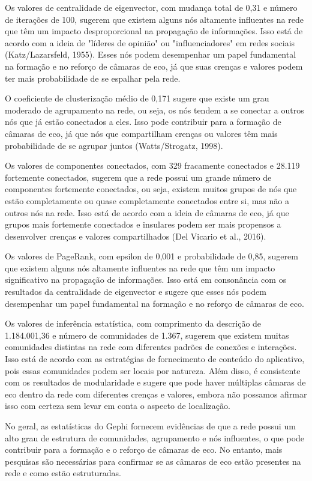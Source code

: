 Os valores de centralidade de eigenvector, com mudança total de 0,31 e número de iterações de 100, sugerem que existem alguns nós altamente influentes na rede que têm um impacto desproporcional na propagação de informações. Isso está de acordo com a ideia de "líderes de opinião" ou "influenciadores" em redes sociais (Katz/Lazarsfeld, 1955). Esses nós podem desempenhar um papel fundamental na formação e no reforço de câmaras de eco, já que suas crenças e valores podem ter mais probabilidade de se espalhar pela rede.

O coeficiente de clusterização médio de 0,171 sugere que existe um grau moderado de agrupamento na rede, ou seja, os nós tendem a se conectar a outros nós que já estão conectados a eles. Isso pode contribuir para a formação de câmaras de eco, já que nós que compartilham crenças ou valores têm mais probabilidade de se agrupar juntos (Watts/Strogatz, 1998).

Os valores de componentes conectados, com 329 fracamente conectados e 28.119 fortemente conectados, sugerem que a rede possui um grande número de componentes fortemente conectados, ou seja, existem muitos grupos de nós que estão completamente ou quase completamente conectados entre si, mas não a outros nós na rede. Isso está de acordo com a ideia de câmaras de eco, já que grupos mais fortemente conectados e insulares podem ser mais propensos a desenvolver crenças e valores compartilhados (Del Vicario et al., 2016).

Os valores de PageRank, com epsilon de 0,001 e probabilidade de 0,85, sugerem que existem alguns nós altamente influentes na rede que têm um impacto significativo na propagação de informações. Isso está em consonância com os resultados da centralidade de eigenvector e sugere que esses nós podem desempenhar um papel fundamental na formação e no reforço de câmaras de eco.

Os valores de inferência estatística, com comprimento da descrição de 1.184.001,36 e número de comunidades de 1.367, sugerem que existem muitas comunidades distintas na rede com diferentes padrões de conexões e interações. Isso está de acordo com as estratégias de fornecimento de conteúdo do aplicativo, pois essas comunidades podem ser locais por natureza. Além disso, é consistente com os resultados de modularidade e sugere que pode haver múltiplas câmaras de eco dentro da rede com diferentes crenças e valores, embora não possamos afirmar isso com certeza sem levar em conta o aspecto de localização.

No geral, as estatísticas do Gephi fornecem evidências de que a rede possui um alto grau de estrutura de comunidades, agrupamento e nós influentes, o que pode contribuir para a formação e o reforço de câmaras de eco. No entanto, mais pesquisas são necessárias para confirmar se as câmaras de eco estão presentes na rede e como estão estruturadas.

